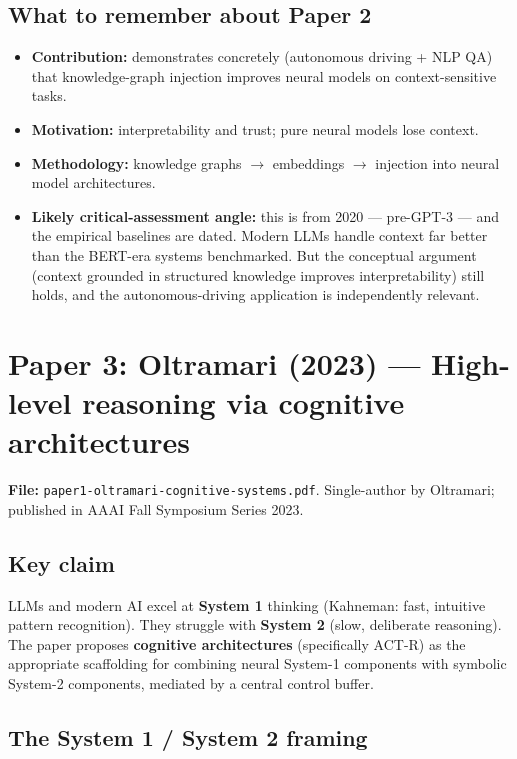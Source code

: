\documentclass[11pt, a4paper]{article}
\begin{document}
\subsection{What to remember about Paper 2}

\begin{itemize}
  \item \textbf{Contribution:} demonstrates concretely (autonomous driving + NLP QA) that knowledge-graph injection improves neural models on context-sensitive tasks.
  \item \textbf{Motivation:} interpretability and trust; pure neural models lose context.
  \item \textbf{Methodology:} knowledge graphs $\to$ embeddings $\to$ injection into neural model architectures.
  \item \textbf{Likely critical-assessment angle:} this is from 2020 — pre-GPT-3 — and the empirical baselines are dated. Modern LLMs handle context far better than the BERT-era systems benchmarked. But the conceptual argument (context grounded in structured knowledge improves interpretability) still holds, and the autonomous-driving application is independently relevant.
\end{itemize}

\section{Paper 3: Oltramari (2023) — High-level reasoning via cognitive architectures}

\textbf{File:} \texttt{paper1-oltramari-cognitive-systems.pdf}. Single-author by Oltramari; published in AAAI Fall Symposium Series 2023.

\subsection{Key claim}

LLMs and modern AI excel at \textbf{System 1} thinking (Kahneman: fast, intuitive pattern recognition). They struggle with \textbf{System 2} (slow, deliberate reasoning). The paper proposes \textbf{cognitive architectures} (specifically ACT-R) as the appropriate scaffolding for combining neural System-1 components with symbolic System-2 components, mediated by a central control buffer.

\subsection{The System 1 / System 2 framing}
\end{document}
